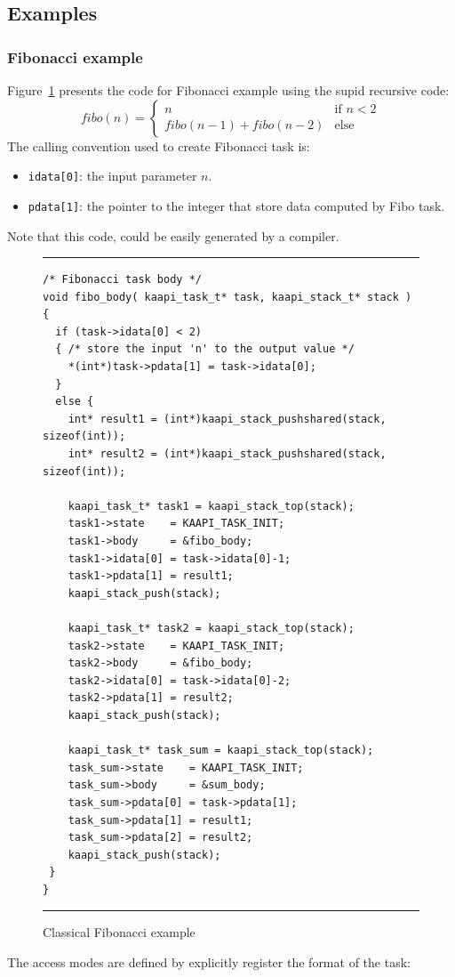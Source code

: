 \documentclass{report}
\begin{document}
\subsection{Examples}

\subsubsection{Fibonacci example}

Figure~\ref{fig:fibo} presents the code for Fibonacci example using the supid recursive code:
$$
fibo(n) = 
\left\{
\begin{array}{ll}
n & \mbox{if } n<2\\
fibo(n-1)+fibo(n-2) & \mbox{else}
\end{array}
\right.
$$
The calling convention used to create Fibonacci task is:
\begin{itemize}
\item \verb+idata[0]+: the input parameter $n$.
\item \verb+pdata[1]+: the pointer to the integer that store data computed by Fibo task.
\end{itemize}
Note that this code, could be easily generated by a compiler.

\begin{figure}[!h]
\hrule
\begin{verbatim}
/* Fibonacci task body */
void fibo_body( kaapi_task_t* task, kaapi_stack_t* stack )
{
  if (task->idata[0] < 2)
  { /* store the input 'n' to the output value */
    *(int*)task->pdata[1] = task->idata[0];
  }
  else {
    int* result1 = (int*)kaapi_stack_pushshared(stack, sizeof(int));
    int* result2 = (int*)kaapi_stack_pushshared(stack, sizeof(int));

    kaapi_task_t* task1 = kaapi_stack_top(stack);
    task1->state    = KAAPI_TASK_INIT;
    task1->body     = &fibo_body;
    task1->idata[0] = task->idata[0]-1;
    task1->pdata[1] = result1;
    kaapi_stack_push(stack);

    kaapi_task_t* task2 = kaapi_stack_top(stack);
    task2->state    = KAAPI_TASK_INIT;
    task2->body     = &fibo_body;
    task2->idata[0] = task->idata[0]-2;
    task2->pdata[1] = result2;
    kaapi_stack_push(stack);

    kaapi_task_t* task_sum = kaapi_stack_top(stack);
    task_sum->state    = KAAPI_TASK_INIT;
    task_sum->body     = &sum_body;
    task_sum->pdata[0] = task->pdata[1];
    task_sum->pdata[1] = result1;
    task_sum->pdata[2] = result2;
    kaapi_stack_push(stack);    
 }
}
\end{verbatim}
\hrule
\caption{Classical Fibonacci example}
\label{fig:fibo}
\end{figure}
The access modes are defined by explicitly register the format of the task:
\end{document}
